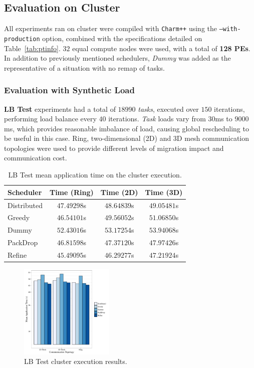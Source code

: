 \subsection{Evaluation on Cluster}

All experiments ran on cluster were compiled with \texttt{Charm++} using the \texttt{--with-production} option, combined with the specifications detailed on Table~\ref{tab:ptinfo}.
$32$ equal compute nodes were used, with a total of \textbf{128 PEs}.
In addition to previously mentioned schedulers, \textit{Dummy} was added\textbf{} as the representative of a situation with no remap of tasks.

\subsubsection*{Evaluation with Synthetic Load}

\textbf{LB Test} experiments had a total of $18990$ \textit{tasks}, executed over $150$ iterations, performing load balance every $40$ iterations.
\textit{Task} loads vary from $30$ms to $9000$ms, which provides reasonable imbalance of load, causing global rescheduling to be useful in this case.
Ring, two-dimensional (2D) and 3D mesh communication topologies were used to provide different levels of migration impact and communication cost.

\begin{table}[t]
	\centering
	\begin{tabular}{l | c | c | c}
    	Scheduler & Time (Ring) & Time (2D) & Time (3D) \\ \hline
        Distributed & $47.49298$s & $48.64839$s & $49.05481$s \\
        Greedy & $46.54101$s & $49.56052$s & $51.06850$s \\
        Dummy & $52.43016$s & $53.17254$s & $53.94068$s \\
        PackDrop & $46.81598$s & $47.37120$s & $47.97426$s \\
        Refine & $45.49095$s & $46.29277$s & $47.21924$s \\		
	\end{tabular}
    \caption{LB Test mean application time on the cluster execution.}
    \label{tab:lbtest:apptime}
\end{table}

\begin{figure}
	\centering
    \includegraphics[width=0.4\textwidth]{images/apptime_lbtest_g5k.pdf}
    \caption{LB Test cluster execution results.}
    \label{fig:eval:g5k:lbtest:apptime}
\end{figure}


